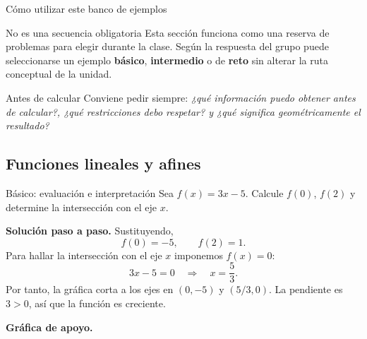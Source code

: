 \documentclass[aspectratio=169,10pt]{beamer}
\begin{document}
\begin{frame}{Cómo utilizar este banco de ejemplos}
\begin{block}{No es una secuencia obligatoria}
Esta sección funciona como una reserva de problemas para elegir durante la clase. Según la respuesta del grupo puede seleccionarse un ejemplo \textbf{básico}, \textbf{intermedio} o de \textbf{reto} sin alterar la ruta conceptual de la unidad.
\end{block}
\begin{alertblock}{Antes de calcular}
Conviene pedir siempre: \emph{¿qué información puedo obtener antes de calcular?, ¿qué restricciones debo respetar? y ¿qué significa geométricamente el resultado?}
\end{alertblock}
\end{frame}

\subsection*{Funciones lineales y afines}

\begin{frame}{Básico: evaluación e interpretación}
Sea $f(x)=3x-5$. Calcule $f(0)$, $f(2)$ y determine la intersección con el eje $x$.

\textbf{Solución paso a paso.} Sustituyendo,
\[
f(0)=-5,\qquad f(2)=1.
\]
Para hallar la intersección con el eje $x$ imponemos $f(x)=0$:
\[
3x-5=0\quad\Longrightarrow\quad x=\frac53.
\]
Por tanto, la gráfica corta a los ejes en $(0,-5)$ y $(5/3,0)$. La pendiente es $3>0$, así que la función es creciente.


\textbf{Gráfica de apoyo.}\medskip
\begin{center}
\end{center}

\end{frame}
\end{document}
